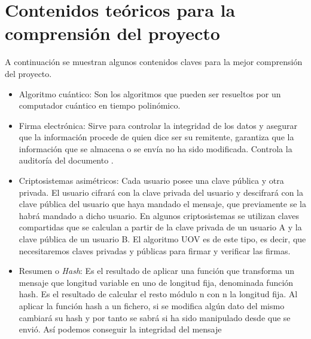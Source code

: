 \section{Contenidos teóricos para la comprensión del proyecto}

A continuación se muestran algunos contenidos claves para la mejor comprensión del proyecto.

\begin{itemize}
	\item Algoritmo cuántico: Son los algoritmos que pueden ser resueltos por un computador cuántico en tiempo polinómico.



 	\item Firma electrónica: Sirve para controlar la integridad de los datos y asegurar que la información procede de quien dice ser su remitente, garantiza que la información que se almacena o se envía no ha sido modificada. Controla la auditoría del documento \cite{firmaDigital}. 


	\item Criptosistemas asimétricos: Cada usuario posee una clave pública y otra privada. El usuario cifrará con la clave privada del usuario y descifrará con la clave pública del usuario que haya mandado el mensaje, que previamente se la habrá mandado a dicho usuario. En algunos criptosistemas se utilizan claves compartidas que se calculan a partir de la clave privada de un usuario A y la clave pública de un usuario B. El algoritmo UOV es de este tipo, es decir, que necesitaremos claves privadas y públicas para firmar y verificar las firmas.


	\item Resumen o \textit{Hash}: Es el resultado de aplicar una función que transforma un mensaje que longitud variable en uno de longitud fija, denominada función hash. Es el resultado de calcular el resto módulo n con n la longitud fija. Al aplicar la función hash a un fichero, si se modifica algún dato del mismo cambiará su hash y por tanto se sabrá si ha sido manipulado desde que se envió. Así podemos conseguir la integridad del mensaje



\end{itemize}

